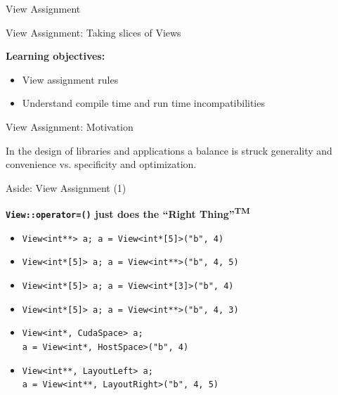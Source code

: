 \begin{frame}[fragile]{View Assignment}

  {\Huge View Assignment: Taking slices of Views}

  \vspace{20pt}

  \textbf{Learning objectives:}
  \begin{itemize}
    \item{View assignment rules}
    \item{Understand compile time and run time incompatibilities}
  \end{itemize}

  \vspace{-20pt}

\end{frame}


\begin{frame}[fragile]{View Assignment: Motivation}

  In the design of libraries and applications a balance is struck generality and convenience vs. specificity and optimization.
  

\end{frame}


\begin{frame}[fragile]{Aside: View Assignment (1)}

  \textbf{\texttt{View::operator=()} just does the ``Right Thing''\textsuperscript{TM}}

  \vspace{5pt}

  \begin{itemize}
    \item{\texttt{View<int**> a; a = View<int*[5]>("b", 4)}}
    \pause
    {\color{darkgreen}{$=>$ Okay}}
    \pause
    \item{\texttt{View<int*[5]> a; a = View<int**>("b", 4, 5)}}\\
    \pause
    {\color{darkgreen}{$=>$ Okay, checked at runtime}}
    \pause
    \item{\texttt{View<int*[5]> a; a = View<int*[3]>("b", 4)}}\\
    \pause
    {\color{darkred}{$=>$ Compilation error}}
    \pause
    \item{\texttt{View<int*[5]> a; a = View<int**>("b", 4, 3)}}\\
    \pause
    {\color{darkred}{$=>$ Runtime error}}
    \pause
    \item{\texttt{View<int*, CudaSpace> a;}\\
    \texttt{a = View<int*, HostSpace>("b", 4)}}\\
    \pause
    {\color{darkred}{$=>$ Compilation error}}
    \item{\texttt{View<int**, LayoutLeft> a;}\\
    \texttt{a = View<int**, LayoutRight>("b", 4, 5)}}\\
    \pause
    {\color{darkred}{$=>$ Compilation error}}
  \end{itemize}

\end{frame}

